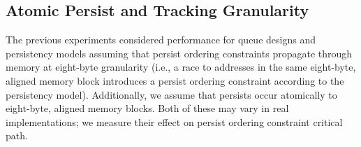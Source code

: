 %
%
%
%

\subsection{Atomic Persist and Tracking Granularity}
\label{section:Evaluation:Granularity}

The previous experiments considered performance for queue designs and persistency models assuming that persist ordering constraints propagate through memory at eight-byte granularity (i.e., a race to addresses in the same eight-byte, aligned memory block introduces a persist ordering constraint according to the persistency model).
Additionally, we assume that persists occur atomically to eight-byte, aligned memory blocks.
Both of these may vary in real implementations; we measure their effect on persist ordering constraint critical path.

